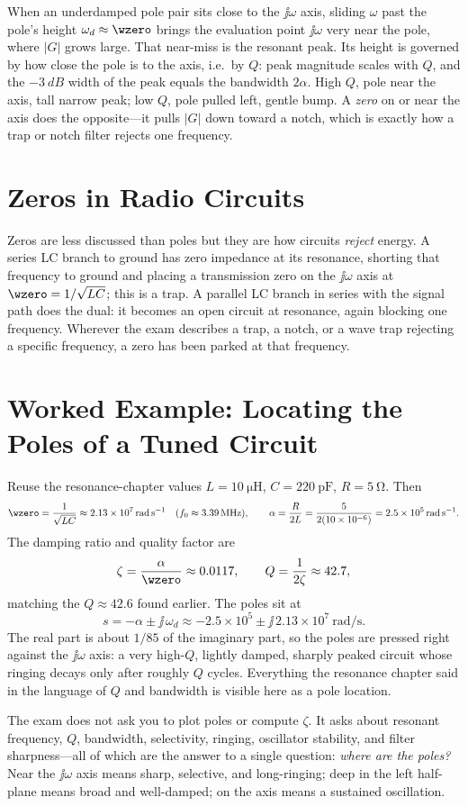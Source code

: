 When an underdamped pole pair sits close to the \(\jj\omega\) axis, sliding
\(\omega\) past the pole's height \(\omega_d\approx\wzero\) brings the evaluation
point \(\jj\omega\) very near the pole, where \(|G|\) grows large. That near-miss
is the resonant peak. Its height is governed by how close the pole is to the
axis, i.e.\ by \(Q\): peak magnitude scales with \(Q\), and the \(-\SI{3}{dB}\)
width of the peak equals the bandwidth \(2\alpha\). High \(Q\), pole near the
axis, tall narrow peak; low \(Q\), pole pulled left, gentle bump. A
\emph{zero} on or near the axis does the opposite---it pulls \(|G|\) down toward
a notch, which is exactly how a trap or notch filter rejects one frequency.

\section{Zeros in Radio Circuits}
Zeros are less discussed than poles but they are how circuits \emph{reject}
energy. A series LC branch to ground has zero impedance at its resonance, shorting
that frequency to ground and placing a transmission zero on the \(\jj\omega\)
axis at \(\wzero=1/\sqrt{LC}\); this is a trap. A parallel LC branch in series
with the signal path does the dual: it becomes an open circuit at resonance,
again blocking one frequency. Wherever the exam describes a trap, a notch, or a
wave trap rejecting a specific frequency, a zero has been parked at that
frequency.

\section{Worked Example: Locating the Poles of a Tuned Circuit}
Reuse the resonance-chapter values \(L=\SI{10}{\micro\henry}\),
\(C=\SI{220}{\pico\farad}\), \(R=\SI{5}{\ohm}\). Then
\[
\wzero=\frac{1}{\sqrt{LC}}\approx\SI{2.13e7}{\radian\per\second}
\quad(f_0\approx\SI{3.39}{\mega\hertz}),
\qquad
\alpha=\frac{R}{2L}=\frac{5}{2(10\times10^{-6})}=\SI{2.5e5}{\radian\per\second}.
\]
The damping ratio and quality factor are
\[
\zeta=\frac{\alpha}{\wzero}\approx 0.0117,
\qquad
Q=\frac{1}{2\zeta}\approx 42.7,
\]
matching the \(Q\approx42.6\) found earlier. The poles sit at
\[
s=-\alpha\pm\jj\,\omega_d\approx-2.5\times10^{5}\pm\jj\,2.13\times10^{7}
\ \si{\radian\per\second}.
\]
The real part is about \(1/85\) of the imaginary part, so the poles are pressed
right against the \(\jj\omega\) axis: a very high-\(Q\), lightly damped,
sharply peaked circuit whose ringing decays only after roughly \(Q\) cycles.
Everything the resonance chapter said in the language of \(Q\) and bandwidth is
visible here as a pole location.

\begin{exambox}
The exam does not ask you to plot poles or compute \(\zeta\). It asks about
resonant frequency, \(Q\), bandwidth, selectivity, ringing, oscillator
stability, and filter sharpness---all of which are the answer to a single
question: \emph{where are the poles?} Near the \(\jj\omega\) axis means sharp,
selective, and long-ringing; deep in the left half-plane means broad and
well-damped; on the axis means a sustained oscillation.
\end{exambox}
